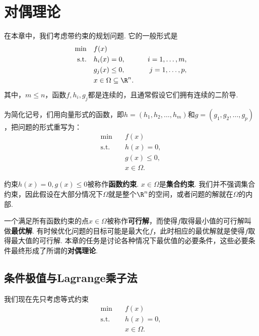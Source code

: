 \chapter{对偶理论}\label{chap:duality}
在本章中，我们考虑带约束的规划问题. 它的一般形式是
        \begin{alignat*}{2}
        \min\quad&f({x}) \\
        \text{s.t.}\quad&h_i({x})=0,&\quad i=1,\dots,m,\\
        &g_j(x)\leq 0,&\quad j=1,\dots,p,\\
        &x\in\Omega\subseteq\R^n.
        \end{alignat*}
其中，$m\le n$，函数$f,h_i,g_j$都是连续的，且通常假设它们拥有连续的二阶导. 

为简化记号，们用向量形式的函数，即${h}=(h_1,h_2,\dots,h_m)$和${g}=(g_1,g_2,\dots,g_p)$，把问题的形式重写为：
    \begin{align*}
        \min\quad& f({x}) \\
        \text{s.t.}\quad& {h}({x})={0},\\
        & {g}({x})\le {0}, \\
        & {x} \in \Omega.
    \end{align*}

约束${h}({x})={0},{g}({x})\le{0}$被称作\textbf{函数约束}. ${x}\in\Omega$是\textbf{集合约束}. 我们并不强调集合约束，因此假设在大部分情况下$\Omega$就是整个$\R^n$的空间，或者问题的解就在$\Omega$的内部. 

一个满足所有函数约束的点${x}\in\Omega$被称作\textbf{可行解}，而使得$f$取得最小值的可行解叫做\textbf{最优解}. 有时候优化问题的目标可能是最大化$f$，此时相应的最优解就是使得$f$取得最大值的可行解. 本章的任务是讨论各种情况下最优值的必要条件，这些必要条件最终形成了所谓的\textbf{对偶理论}. 

\section{条件极值与Lagrange乘子法}
我们现在先只考虑等式约束
\begin{equation}
\begin{aligned}
        \min\quad& f({x}) \\
        \text{s.t.}\quad& {h}({x})={0},\\
        & {x} \in \Omega.
\end{aligned}    \label{eq:eq-constraint-only-differentiable}
\end{equation}

